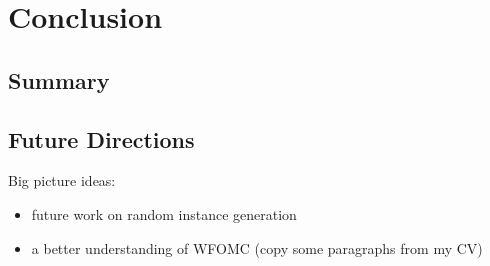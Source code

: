 \chapter{Conclusion}

\section{Summary}

\section{Future Directions}

Big picture ideas:
\begin{itemize}
\item future work on random instance generation
\item a better understanding of WFOMC (copy some paragraphs from my CV)
\end{itemize}
